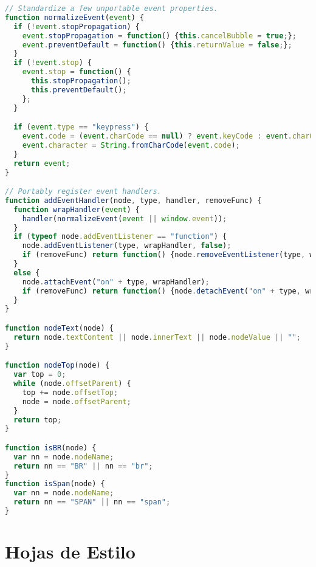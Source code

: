 \begin{lstlisting}[language=Javascript]
// Standardize a few unportable event properties.
function normalizeEvent(event) {
  if (!event.stopPropagation) {
    event.stopPropagation = function() {this.cancelBubble = true;};
    event.preventDefault = function() {this.returnValue = false;};
  }
  if (!event.stop) {
    event.stop = function() {
      this.stopPropagation();
      this.preventDefault();
    };
  }

  if (event.type == "keypress") {
    event.code = (event.charCode == null) ? event.keyCode : event.charCode;
    event.character = String.fromCharCode(event.code);
  }
  return event;
}

// Portably register event handlers.
function addEventHandler(node, type, handler, removeFunc) {
  function wrapHandler(event) {
    handler(normalizeEvent(event || window.event));
  }
  if (typeof node.addEventListener == "function") {
    node.addEventListener(type, wrapHandler, false);
    if (removeFunc) return function() {node.removeEventListener(type, wrapHandler, false);};
  }
  else {
    node.attachEvent("on" + type, wrapHandler);
    if (removeFunc) return function() {node.detachEvent("on" + type, wrapHandler);};
  }
}

function nodeText(node) {
  return node.textContent || node.innerText || node.nodeValue || "";
}

function nodeTop(node) {
  var top = 0;
  while (node.offsetParent) {
    top += node.offsetTop;
    node = node.offsetParent;
  }
  return top;
}

function isBR(node) {
  var nn = node.nodeName;
  return nn == "BR" || nn == "br";
}
function isSpan(node) {
  var nn = node.nodeName;
  return nn == "SPAN" || nn == "span";
}
\end{lstlisting}


\section{Hojas de Estilo}

